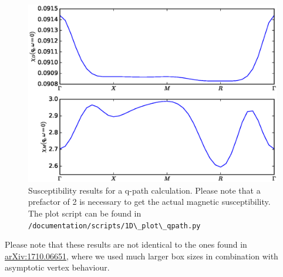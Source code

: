 \documentclass[a4paper,11pt]{article}
\numberwithin{equation}{section} %
\begin{document}
\begin{figure}[H]
\begin{center}
\includegraphics[scale=0.75]{qpath.eps}
\caption{Susceptibility results for a q-path calculation. Please note that a prefactor of 2 is necessary to get the actual magnetic susceptibility. The plot script can be found in {\color{blue}\protect\Verb+/documentation/scripts/1D\_plot\_qpath.py+}}
\end{center}
\end{figure}

Please note that these results are not identical to the ones found in \href{https://arxiv.org/abs/1710.06651}{arXiv:1710.06651}, where we used much larger box sizes in combination with asymptotic vertex behaviour.
\end{document}
